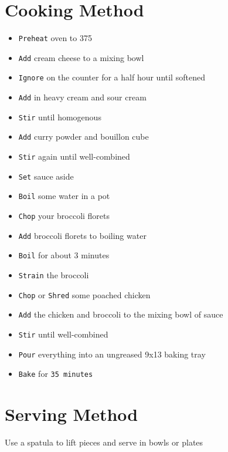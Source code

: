 \documentclass{article}
\let\US\SI
\begin{document}
\begin{multicols}{2}
\section{Cooking Method}
\begin{itemize}
	\item \verb|Preheat| oven to \US{375}{\fahrenheit}	
	\item \verb|Add| cream cheese to a mixing bowl
	\item \verb|Ignore| on the counter for a half hour until softened
	\item \verb|Add| in heavy cream and sour cream
	\item \verb|Stir| until homogenous
	\item \verb|Add| curry powder\cite{CURRYPOWDER} and bouillon cube
	\item \verb|Stir| again until well-combined
	\item \verb|Set| sauce aside
	\item \verb|Boil| some water in a pot
	\item \verb|Chop| your broccoli florets
	\item \verb|Add| broccoli florets to boiling water
	\item \verb|Boil| for about 3 minutes
	\item \verb|Strain| the broccoli
	\item \verb|Chop| or \verb|Shred| some poached chicken\cite{CHICKEN}
	\item \verb|Add| the chicken and broccoli to the mixing bowl of sauce
	\item \verb|Stir| until well-combined
	\item \verb|Pour| everything into an ungreased 9x13 baking tray
	\item \verb|Bake| for \verb|35 minutes|
\end{itemize}

\section{Serving Method}
Use a spatula to lift pieces and serve in bowls or plates



\end{multicols}
\end{document}
